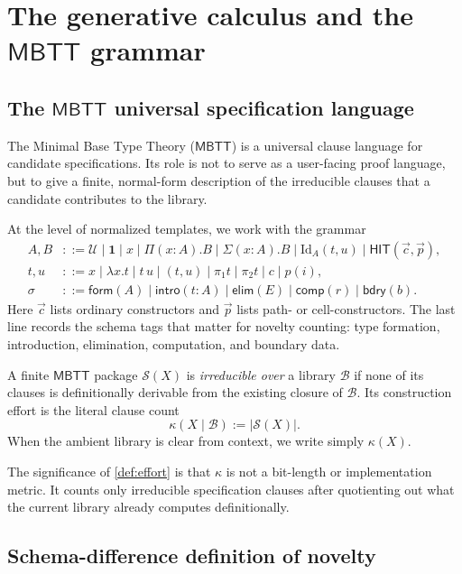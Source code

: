 \documentclass{lmcs}
\newcommand{\U}{\mathcal{U}}
\newcommand{\B}{\mathcal{B}}
\newcommand{\Scal}{\mathcal{S}}
\newcommand{\Id}{\mathrm{Id}}
\newcommand{\HIT}{\mathsf{HIT}}
\newcommand{\MBTT}{\mathsf{MBTT}}
\begin{document}
\section{The generative calculus and the \texorpdfstring{$\MBTT$}{MBTT} grammar}
\label{sec:mbtt}

\subsection{The \texorpdfstring{$\MBTT$}{MBTT} universal specification language}

The Minimal Base Type Theory ($\MBTT$) is a universal clause language for candidate specifications. Its role is not to serve as a user-facing proof language, but to give a finite, normal-form description of the irreducible clauses that a candidate contributes to the library.

At the level of normalized templates, we work with the grammar
\begin{align*}
A,B &::= \U \mid \mathbf 1 \mid x \mid \Pi(x:A).B \mid \Sigma(x:A).B \mid \Id_A(t,u) \mid \HIT(\vec c,\vec p),\\
 t,u &::= x \mid \lambda x.t \mid t\,u \mid (t,u) \mid \pi_1 t \mid \pi_2 t \mid c \mid p(i),\\
 \sigma &::= \mathsf{form}(A) \mid \mathsf{intro}(t:A) \mid \mathsf{elim}(E) \mid \mathsf{comp}(r) \mid \mathsf{bdry}(b).
\end{align*}
Here $\vec c$ lists ordinary constructors and $\vec p$ lists path- or cell-constructors. The last line records the schema tags that matter for novelty counting: type formation, introduction, elimination, computation, and boundary data.

\begin{defi}
\label{def:effort}
A finite $\MBTT$ package $\Scal(X)$ is \emph{irreducible over} a library $\B$ if none of its clauses is definitionally derivable from the existing closure of $\B$. Its construction effort is the literal clause count
\[
  \kappa(X\mid\B) := |\Scal(X)|.
\]
When the ambient library is clear from context, we write simply $\kappa(X)$.
\end{defi}

The significance of \autoref{def:effort} is that $\kappa$ is not a bit-length or implementation metric. It counts only irreducible specification clauses after quotienting out what the current library already computes definitionally.

\subsection{Schema-difference definition of novelty}
\end{document}
